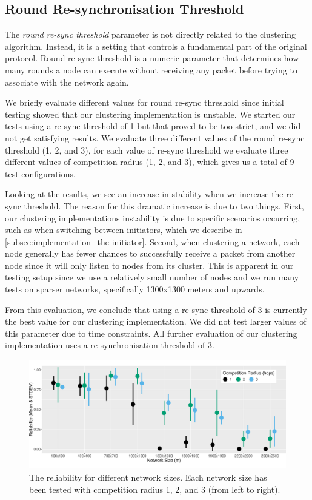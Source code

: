 \subsection{Round Re-synchronisation Threshold}
The \emph{round re-sync threshold} parameter is not directly related to the clustering algorithm. Instead, it is a setting that controls a fundamental part of the original \atwo{} protocol. Round re-sync threshold is a numeric parameter that determines how many rounds a node can execute without receiving any packet before trying to associate with the network again. 

We briefly evaluate different values for round re-sync threshold since initial testing showed that our clustering implementation is unstable. We started our tests using a re-sync threshold of 1 but that proved to be too strict, and we did not get satisfying results. We evaluate three different values of the round re-sync threshold (1, 2, and 3), for each value of re-sync threshold we evaluate three different values of competition radius (1, 2, and 3), which gives us a total of 9 test configurations.

Looking at the results, we see an increase in stability when we increase the re-sync threshold. The reason for this dramatic increase is due to two things. First, our clustering implementations instability is due to specific scenarios occurring, such as when switching between initiators, which we describe in \cref{subsec:implementation_the-initiator}. Second, when clustering a network, each node generally has fewer chances to successfully receive a packet from another node since it will only listen to nodes from its cluster. This is apparent in our testing setup since we use a relatively small number of nodes and we run many tests on sparser networks, specifically 1300x1300 meters and upwards. 

From this evaluation, we conclude that using a re-sync threshold of 3 is currently the best value for our clustering implementation. We did not test larger values of this parameter due to time constraints. All further evaluation of our clustering implementation uses a re-synchronisation threshold of 3.

\begin{figure}[bt]
    \centering
    \includegraphics[width=\textwidth, keepaspectratio]{figure/Results/ParameterEvaluation/CompetitionRadius_Reliability.pdf}
    \caption{The reliability for different network sizes. Each network size has been tested with competition radius 1, 2, and 3 (from left to right).}
    \label{fig:comp-radius-reliability}
\end{figure}


